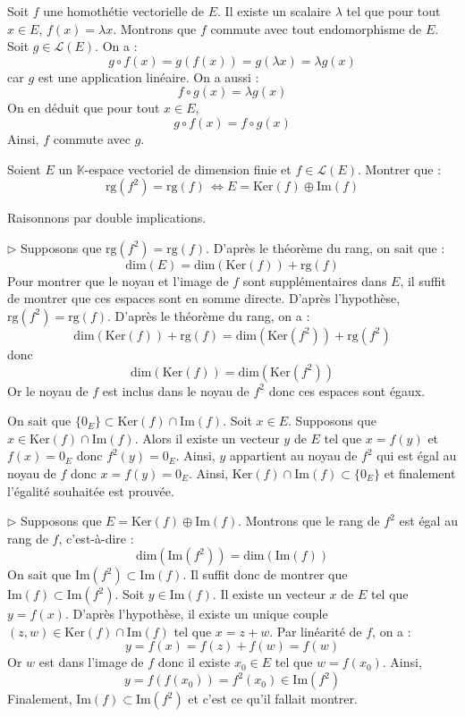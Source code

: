 \documentclass[a4paper,10pt]{report}
\begin{document}
\begin{enumerate}
\medskip

\noindent Soit $f$ une homothétie vectorielle de $E$. Il existe un scalaire $\lambda$ tel que pour tout $x \in E$, $f(x)= \lambda x$. Montrons que $f$ commute avec tout endomorphisme de $E$. Soit $g \in \mathcal{L}(E)$. On a :
$$ g \circ f(x) = g (f(x)) = g(\lambda x)= \lambda g(x)$$
car $g$ est une application linéaire. On a aussi :
$$ f \circ g(x) = \lambda g(x)$$
On en déduit que pour tout $x \in E$,
$$ g \circ f(x) = f \circ g(x)$$
Ainsi, $f$ commute avec $g$.
\end{enumerate}

\begin{Exercice}{} Soient $E$ un $\mathbb{K}$-espace vectoriel de dimension finie et $f \in \mathcal{L}(E)$. Montrer que :
$$ \textrm{rg}(f^2 ) =  \textrm{rg}( f ) \, \Longleftrightarrow E = \textrm{Ker}(f) \oplus \textrm{Im}(f) $$
\end{Exercice}

\corr Raisonnons par double implications.

\medskip

\noindent $\rhd$ Supposons que $\textrm{rg}(f^2 ) =  \textrm{rg}( f )$. D'après le théorème du rang, on sait que :
$$ \textrm{dim}(E) = \textrm{dim}( \textrm{Ker}(f)) + \textrm{rg}( f )$$
Pour montrer que le noyau et l'image de $f$ sont supplémentaires dans $E$, il suffit de montrer que ces espaces sont en somme directe. D'après l'hypothèse, $\textrm{rg}(f^2 ) =  \textrm{rg}( f )$. D'après le théorème du rang, on a :
$$ \textrm{dim}( \textrm{Ker}(f)) + \textrm{rg}( f ) = \textrm{dim}( \textrm{Ker}(f^2)) + \textrm{rg}( f^2)$$
donc 
$$ \textrm{dim}( \textrm{Ker}(f)) = \textrm{dim}( \textrm{Ker}(f^2))$$
Or le noyau de $f$ est inclus dans le noyau de $f^2$ donc ces espaces sont égaux.

\medskip

\noindent On sait que $\lbrace 0_E \rbrace \subset \textrm{Ker}(f) \cap \textrm{Im}(f)$. Soit $x \in E$. Supposons que $x \in \textrm{Ker}(f) \cap \textrm{Im}(f)$. Alors il existe un vecteur $y$ de $E$ tel que $x=f(y)$ et $f(x)=0_E$ donc $f^2(y)=0_E$. Ainsi, $y$ appartient au noyau de $f^2$ qui est égal au noyau de $f$ donc $x=f(y)=0_E$. Ainsi, $\textrm{Ker}(f) \cap \textrm{Im}(f) \subset \lbrace 0_E \rbrace$ et finalement l'égalité souhaitée est prouvée.


\medskip

\noindent $\rhd$ Supposons que $E = \textrm{Ker}(f) \oplus \textrm{Im}(f)$. Montrons que le rang de $f^2$ est égal au rang de $f$, c'est-à-dire :
$$ \textrm{dim}(\textrm{Im}(f^2)) = \textrm{dim}(\textrm{Im}(f))$$
On sait que $\textrm{Im}(f^2) \subset \textrm{Im}(f)$. Il suffit donc de montrer que $\textrm{Im}(f) \subset \textrm{Im}(f^2)$. Soit $y \in \textrm{Im}(f)$. Il existe un vecteur $x$ de $E$ tel que $y=f(x)$. D'après l'hypothèse, il existe un unique couple $(z,w) \in \textrm{Ker}(f) \cap \textrm{Im}(f)$ tel que $x=z+w$. Par linéarité de $f$, on a :
$$ y = f(x) = f(z)+f(w) = f(w)$$
Or $w$ est dans l'image de $f$ donc il existe $x_0 \in E$ tel que $w=f(x_0)$. Ainsi,
$$ y = f(f(x_0))= f^2(x_0) \in  \textrm{Im}(f^2)$$
Finalement, $\textrm{Im}(f) \subset \textrm{Im}(f^2)$ et c'est ce qu'il fallait montrer.
\end{document}
